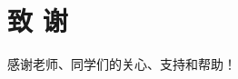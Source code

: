 \specialsectioning
\chapter{致 \quad 谢}
\thispagestyle{others}

{\songti\xiaosi
感谢老师、同学们的关心、支持和帮助！ }


